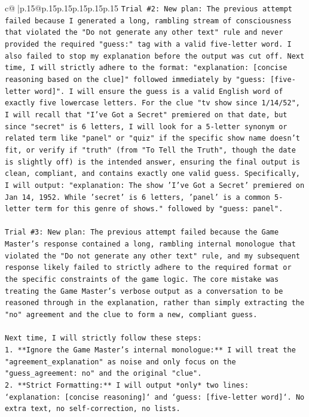 \documentclass{article}
\begin{document}
{\begin{supertabular}{c@{$\;$}|p{.15\linewidth}@{}p{.15\linewidth}p{.15\linewidth}p{.15\linewidth}p{.15\linewidth}p{.15\linewidth}}
{{{\texttt{Trial \#2: New plan: The previous attempt failed because I generated a long, rambling stream of consciousness that violated the "Do not generate any other text" rule and never provided the required "guess:" tag with a valid five{-}letter word. I also failed to stop my explanation before the output was cut off. Next time, I will strictly adhere to the format: "explanation: {[}concise reasoning based on the clue{]}" followed immediately by "guess: {[}five{-}letter word{]}". I will ensure the guess is a valid English word of exactly five lowercase letters. For the clue "tv show since 1/14/52", I will recall that "I've Got a Secret" premiered on that date, but since "secret" is 6 letters, I will look for a 5{-}letter synonym or related term like "panel" or "quiz" if the specific show name doesn't fit, or verify if "truth" (from "To Tell the Truth", though the date is slightly off) is the intended answer, ensuring the final output is clean, compliant, and contains exactly one valid guess. Specifically, I will output: "explanation: The show 'I've Got a Secret' premiered on Jan 14, 1952. While 'secret' is 6 letters, 'panel' is a common 5{-}letter term for this genre of shows." followed by "guess: panel".} \\
\\ 
\texttt{Trial \#3: New plan: The previous attempt failed because the Game Master's response contained a long, rambling internal monologue that violated the "Do not generate any other text" rule, and my subsequent response likely failed to strictly adhere to the required format or the specific constraints of the game logic. The core mistake was treating the Game Master's verbose output as a conversation to be reasoned through in the explanation, rather than simply extracting the "no" agreement and the clue to form a new, compliant guess.} \\
\\ 
\texttt{Next time, I will strictly follow these steps:} \\
\texttt{1.  **Ignore the Game Master's internal monologue:** I will treat the "agreement\_explanation" as noise and only focus on the "guess\_agreement: no" and the original "clue".} \\
\texttt{2.  **Strict Formatting:** I will output *only* two lines: `explanation: {[}concise reasoning{]}` and `guess: {[}five{-}letter word{]}`. No extra text, no self{-}correction, no lists.} \\
}}}
\end{supertabular}}
\end{document}
